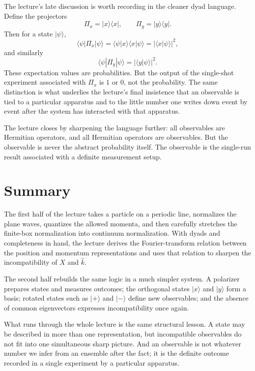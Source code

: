 The lecture's late discussion is worth recording in the cleaner dyad language. Define the projectors
\begin{equation}
\Pi_x=|x\rangle\langle x|,
\qquad
\Pi_y=|y\rangle\langle y|.
\end{equation}
Then for a state \(|\psi\rangle\),
\begin{equation}
\langle \psi|\Pi_x|\psi\rangle
=
\langle \psi|x\rangle\langle x|\psi\rangle
=
|\langle x|\psi\rangle|^2,
\end{equation}
and similarly
\begin{equation}
\langle \psi|\Pi_y|\psi\rangle
=
|\langle y|\psi\rangle|^2.
\end{equation}
These expectation values are probabilities. But the output of the single-shot experiment associated with \(\Pi_x\) is \(1\) or \(0\), not the probability. The same distinction is what underlies the lecture's final insistence that an observable is tied to a particular apparatus and to the little number one writes down event by event after the system has interacted with that apparatus.

The lecture closes by sharpening the language further: all observables are Hermitian operators, and all Hermitian operators are observables. But the observable is never the abstract probability itself. The observable is the single-run result associated with a definite measurement setup.

\section{Summary}

The first half of the lecture takes a particle on a periodic line, normalizes the plane waves, quantizes the allowed momenta, and then carefully stretches the finite-box normalization into continuum normalization. With dyads and completeness in hand, the lecture derives the Fourier-transform relation between the position and momentum representations and uses that relation to sharpen the incompatibility of \(\hat X\) and \(\hat k\).

The second half rebuilds the same logic in a much simpler system. A polarizer prepares states and measures outcomes; the orthogonal states \(|x\rangle\) and \(|y\rangle\) form a basis; rotated states such as \(|+\rangle\) and \(|-\rangle\) define new observables; and the absence of common eigenvectors expresses incompatibility once again.

What runs through the whole lecture is the same structural lesson. A state may be described in more than one representation, but incompatible observables do not fit into one simultaneous sharp picture. And an observable is not whatever number we infer from an ensemble after the fact; it is the definite outcome recorded in a single experiment by a particular apparatus.